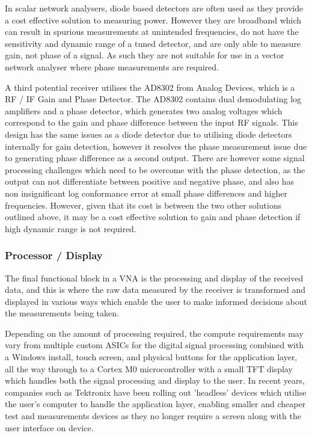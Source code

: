 In scalar network analysers, diode based detectors are often used as they provide a cost effective solution to measuring power. However they are broadband which can result in spurious measurements at unintended frequencies, do not have the sensitivity and dynamic range of a tuned detector, and are only able to measure gain, not phase of a signal. As such they are not suitable for use in a vector network analyser where phase measurements are required.

A third potential receiver utilises the AD8302 from Analog Devices, which is a RF / IF Gain and Phase Detector. \cite{ad8302_datasheet} The AD8302 contains dual demodulating log amplifiers and a phase detector, which generates two analog  voltages which correspond to the gain and phase difference between the input RF signals. This design has the same issues as a diode detector due to utilising diode detectors internally for gain detection, however it resolves the phase measurement issue due to generating phase difference as a second output. There are however some signal processing challenges which need to be overcome with the phase detection, as the output can not differentiate between positive and negative phase, and also has non insignificant log conformance error at small phase differences and higher frequencies. However, given that its cost is between the two other solutions outlined above, it may be a cost effective solution to gain and phase detection if high dynamic range is not required. 

\subsubsection{Processor / Display}
\label{subsubsec:processor display}
The final functional block in a VNA is the processing and display of the received data, and this is where the raw data measured by the receiver is transformed and displayed in various ways which enable the user to make informed decisions about the measurements being taken. 

Depending on the amount of processing required, the compute requirements may vary from multiple custom ASICs for the digital signal processing combined with a Windows install, touch screen, and physical buttons for the application layer, all the way through to a Cortex M0 microcontroller with a small TFT display which handles both the signal processing and display to the user. In recent years, companies such as Tektronix have been rolling out 'headless' devices which utilise the user's computer to handle the application layer, enabling smaller and cheaper test and measurements devices as they no longer require a screen along with the user interface on device. 

